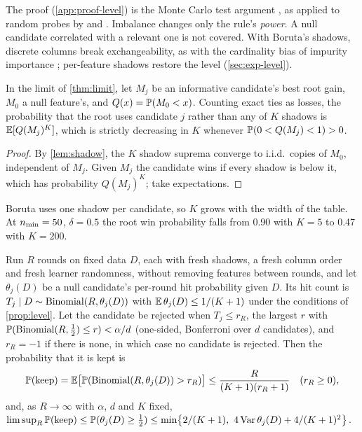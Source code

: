 The proof (\cref{app:proof-level}) is the Monte Carlo test argument \citep{barnard1963discussion,hope1968simplified,besag1989generalized}, as applied to random probes by \citet{stoppiglia2003ranking} and \citet{wu2007controlling}. Imbalance changes only the rule's \emph{power}. A null candidate correlated with a relevant one is not covered. With Boruta's shadows, discrete columns break exchangeability, as with the cardinality bias of impurity importance \citep{strobl2007bias}; per-feature shadows restore the level (\cref{sec:exp-level}).

\begin{corollary}\label{cor:shadows}
In the limit of \cref{thm:limit}, let $M_j$ be an informative candidate's best root gain, $M_0$ a null feature's, and $Q(x) = \P(M_0 < x)$. Counting exact ties as losses, the probability that the root uses candidate $j$ rather than any of $K$ shadows is $\E[Q(M_j)^K]$, which is strictly decreasing in $K$ whenever $\P(0 < Q(M_j) < 1) > 0$.
\end{corollary}

\begin{proof}
By \cref{lem:shadow}, the $K$ shadow suprema converge to i.i.d.\ copies of $M_0$, independent of $M_j$. Given $M_j$ the candidate wins if every shadow is below it, which has probability $Q(M_j)^K$; take expectations.
\end{proof}

Boruta uses one shadow per candidate, so $K$ grows with the width of the table. At $\nmin = 50$, $\delta = 0.5$ the root win probability falls from 0.90 with $K = 5$ to 0.47 with $K = 200$.

\begin{proposition}\label{prop:rounds}
Run $R$ rounds on fixed data $D$, each with fresh shadows, a fresh column order and fresh learner randomness, without removing features between rounds, and let $\theta_j(D)$ be a null candidate's per-round hit probability given $D$. Its hit count is $T_j \mid D \sim \Bin(R, \theta_j(D))$ with $\E\,\theta_j(D) \le 1/(K+1)$ under the conditions of \cref{prop:level}. Let the candidate be rejected when $T_j \le r_R$, the largest $r$ with $\P(\Bin(R,\tfrac12) \le r) < \alpha/d$ (one-sided, Bonferroni over $d$ candidates), and $r_R = -1$ if there is none, in which case no candidate is rejected. Then the probability that it is kept is
\begin{equation}\label{eq:rounds}
  \P(\text{keep}) = \E\bigl[\P(\Bin(R,\theta_j(D)) > r_R)\bigr] \le \frac{R}{(K+1)(r_R+1)}\quad (r_R \ge 0),
\end{equation}
and, as $R\to\infty$ with $\alpha$, $d$ and $K$ fixed, $\limsup_R \P(\text{keep}) \le \P(\theta_j(D) \ge \tfrac12) \le \min\bigl\{2/(K+1),\ 4\operatorname{Var}\theta_j(D) + 4/(K+1)^2\bigr\}$.
\end{proposition}


